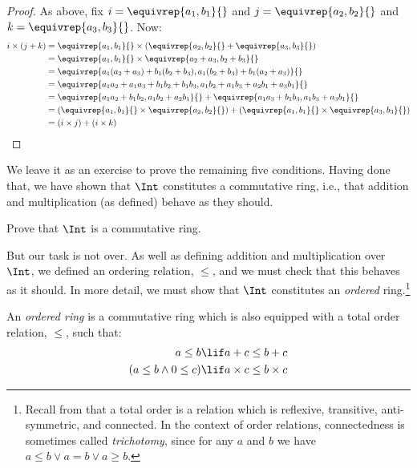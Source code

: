 \begin{proof}
As above, fix $i = \equivrep{a_1, b_1}{}$ and $j =
\equivrep{a_2,b_2}{}$ and $k = \equivrep{a_3, b_3}{}$. Now:
\begin{align*}
	i \times (j + k) 
	&= \equivrep{a_1, b_1}{} \times (\equivrep{a_2,b_2}{} + \equivrep{a_3, b_3}{})\\
	&= \equivrep{a_1, b_1}{} \times \equivrep{a_2 + a_3,b_2+b_3}{}\\
	&= \equivrep{a_1  (a_2 + a_3) + b_1  (b_2+b_3), a_1  (b_2 + b_3) + b_1 (a_2 + a_3)}{}\\
	&= \equivrep{a_1 a_2 + a_1a_3 + b_1 b_2+b_1b_3, a_1 b_2 + a_1b_3 + a_2b_1 + a_3b_1}{}\\		

	&= \equivrep{a_1a_2 + b_1b_2, a_1b_2 + a_2b_1}{} + \equivrep{a_1a_3 + b_1b_3, a_1b_3 + a_3b_1}{}\\
	&= (\equivrep{a_1, b_1}{} \times \equivrep{a_2,b_2}{}) + (\equivrep{a_1, b_1}{} \times  \equivrep{a_3, b_3}{})\\
	&= (i \times j) + (i \times k)
\end{align*}
\end{proof}

We leave it as an exercise to prove the remaining five conditions.
Having done that, we have shown that $\Int$ constitutes a commutative
ring, i.e., that addition and multiplication (as defined) behave as
they should.

\begin{prob}
Prove that $\Int$ is a commutative ring.
\end{prob}

But our task is not over. As well as defining addition and
multiplication over $\Int$, we defined an ordering relation, $\leq$,
and we must check that this behaves as it should. In more detail, we
must show that $\Int$ constitutes an \emph{ordered} ring.\footnote{Recall
	from  that a total order
	is a relation which is reflexive, transitive, anti-symmetric, and connected. 
	In the context of order relations, connectedness is sometimes called
	\emph{trichotomy}, since for any $a$ and $b$ we have $a \leq b \lor a
	= b \lor a \geq b$.} 

\begin{defn}
An \emph{ordered ring} is a commutative ring which is also equipped
with a total order relation, $\leq$, such that:
\begin{align*}
	a \leq b &\lif a + c \leq b + c\\
	(a \leq b \land 0 \leq c) &\lif a \times c \leq b \times c
\end{align*}
\end{defn}


